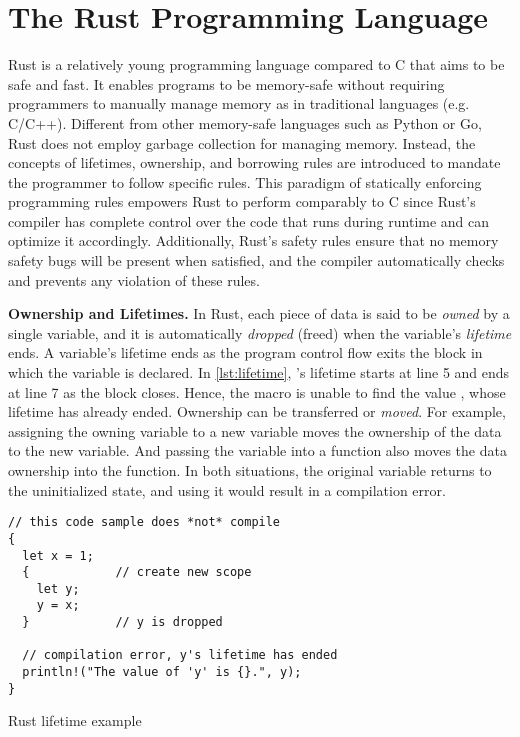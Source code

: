 \section{The Rust Programming Language}
Rust is a relatively young programming language compared to C that aims to be
safe and fast.
It enables programs to be memory-safe without requiring programmers to manually
manage memory as in traditional languages (e.g. C/C++).
Different from other memory-safe languages such as Python or Go, Rust does not
employ garbage collection for managing memory. Instead, the concepts of
lifetimes, ownership, and borrowing rules are introduced to mandate the
programmer to follow specific rules.
This paradigm of statically enforcing programming rules empowers Rust to
perform comparably to C since Rust's compiler has complete control over the
code that runs during runtime and can optimize it accordingly.
Additionally, Rust's safety rules ensure that no memory safety bugs will be
present when satisfied, and the compiler automatically checks and prevents any
violation of these rules.

\textbf{Ownership and Lifetimes.}
In Rust, each piece of data is said to be \textit{owned} by a single
variable, and it is automatically \textit{dropped} (freed) when the
variable's \textit{lifetime} ends. A variable's lifetime ends as the program
control flow exits the block in which the variable is declared.
In \autoref{lst:lifetime}, 's lifetime starts at line 5 and ends at
line 7 as the block closes. Hence, the  macro is unable to find
the value , whose lifetime has already ended.
Ownership can be transferred or \textit{moved}. For example,
assigning the owning variable to a new variable moves the ownership of the
data to the new variable. And passing the variable into a function also moves
the data ownership into the function.
In both situations, the original variable returns to the uninitialized state,
and using it would result in a compilation error.

\begin{listing}[hbtp]
    \begin{verbatim}
// this code sample does *not* compile
{
  let x = 1;
  {            // create new scope
    let y;
    y = x;
  }            // y is dropped

  // compilation error, y's lifetime has ended
  println!("The value of 'y' is {}.", y);
}
    \end{verbatim}
    \caption{Rust lifetime example}
    \label{lst:lifetime}
    \vspace{-0.2cm}
\end{listing}

